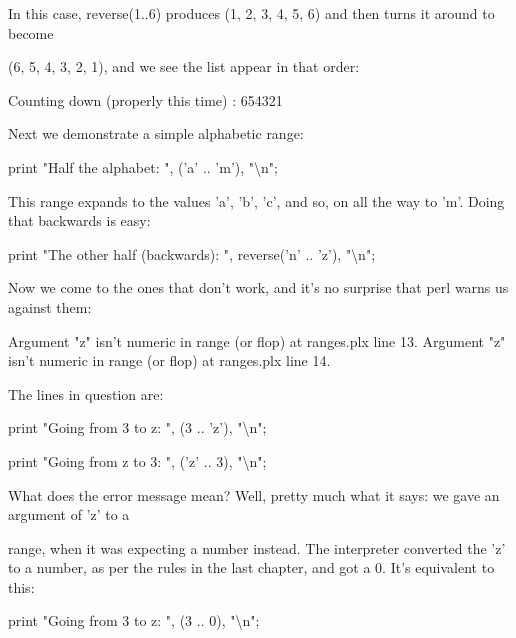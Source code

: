 \documentclass[a4paper,11pt]{book}
\begin{document}
\noindent 

\noindent In this case, reverse(1..6) produces (1, 2, 3, 4, 5, 6) and then turns it around to become

\noindent (6, 5, 4, 3, 2, 1), and we see the list appear in that order:

\noindent 

\noindent Counting down  (properly this time) : 654321

\noindent 

\noindent Next we demonstrate a simple alphabetic range:

\noindent 

\noindent print "Half the alphabet: ", ('a' .. 'm'), "\textbackslash n";

\noindent 

\noindent 

\noindent This range expands to the values 'a', 'b', 'c', and so, on all the way to 'm'. Doing that backwards is easy:

\noindent 

\noindent print "The other half (backwards): ", reverse('n' .. 'z'), "\textbackslash n";

\noindent 

\noindent Now we come to the ones that don't work, and it's no surprise that perl warns us against them:

\noindent 

\noindent Argument "z" isn't numeric in range (or flop) at ranges.plx line 13. Argument "z" isn't numeric in range (or flop) at ranges.plx line 14.

\noindent 

\noindent The lines in question are:

\noindent 

\noindent print "Going from 3 to z: ", (3 .. 'z'), "\textbackslash n";

\noindent print "Going from z to 3: ", ('z' .. 3), "\textbackslash n";

\noindent 

\noindent What does the error message mean? Well, pretty much what it says: we gave an argument of 'z' to a

\noindent range, when it was expecting a number instead. The interpreter converted the 'z' to a number, as per the rules in the last chapter, and got a 0. It's equivalent to this:

\noindent 

\noindent print "Going from 3 to z: ", (3 .. 0), "\textbackslash n";
\end{document}
